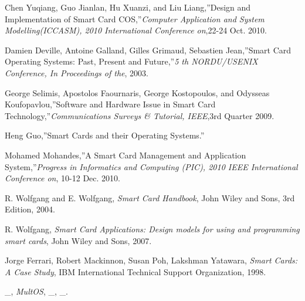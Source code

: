 \documentclass[a4paper, 12pt]{report}
\begin{document}
\begin{thebibliography}{1}

Chen Yuqiang, Guo Jianlan, Hu Xuanzi, and Liu Liang,''Design and Implementation of Smart Card COS,''\emph{Computer Application and System Modelling(ICCASM), 2010 International Conference on},22-24 Oct. 2010.

Damien Deville, Antoine Galland, Gilles Grimaud, Sebastien Jean,''Smart Card Operating Systems: Past, Present and Future,''\emph{5 th NORDU/USENIX Conference, In Proceedings of the}, 2003.

George Selimis, Apostolos Faournaris, George Kostopoulos, and Odysseas Koufopavlou,''Software and Hardware Issue in Smart Card Technology,''\emph{Communications Surveys \& Tutorial, IEEE},3rd Quarter 2009.

Heng Guo,''Smart Cards and their Operating Systems.''

Mohamed Mohandes,''A Smart Card Management and Application System,''\emph{Progress in Informatics and Computing (PIC), 2010 IEEE International Conference on}, 10-12 Dec. 2010.

R. Wolfgang and E. Wolfgang, \emph{Smart Card Handbook}, John Wiley and Sons, 3rd Edition, 2004.

R. Wolfgang, \emph{Smart Card Applications: Design models for using and programming smart cards}, John Wiley and Sons, 2007.

Jorge Ferrari, Robert Mackinnon, Susan Poh, Lakshman Yatawara, \emph{Smart Cards: A Case Study}, IBM International Technical Support Organization, 1998.

_, \emph{MultOS}, _, _.

\end{thebibliography}
\end{document}
